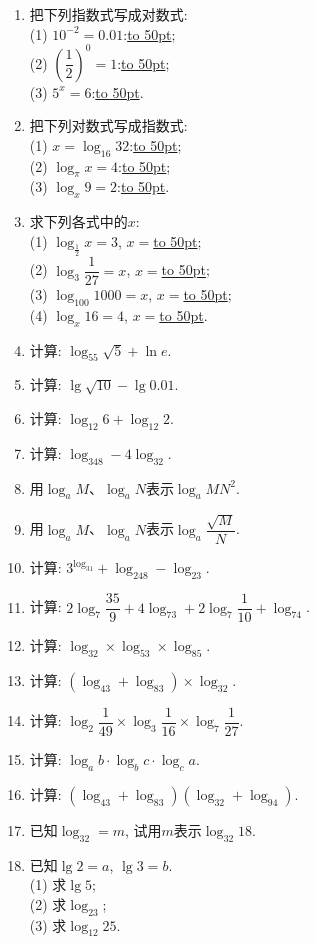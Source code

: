 \documentclass[10pt,a4paper]{article}
\newcommand{\blank}[1]{\underline{\hbox to #1pt{}}}
\begin{document}
\begin{enumerate}[1.]

\item 把下列指数式写成对数式:\\
(1) $10^{-2}=0.01$:\blank{50};\\
(2) $(\dfrac 12)^0=1$:\blank{50};\\
(3) $5^x=6$:\blank{50}.
\item 把下列对数式写成指数式:\\
(1) $x=\log _{16}32$:\blank{50};\\
(2) $\log _{\pi }x=4$:\blank{50};\\
(3) $\log _x9=2$:\blank{50}.
\item 求下列各式中的$x$:\\
(1) $\log _{\frac 12}x=3$, $x=$\blank{50};\\
(2) $\log _3\dfrac 1{27}=x$, $x=$\blank{50};\\
(3) $\log _{100}1000=x$, $x=$\blank{50};\\
(4) $\log _x16=4$, $x=$\blank{50}.
\item 计算: $\log _55\sqrt 5+\ln e$.
\item 计算: $\lg \sqrt {10}-\lg 0.01$.
\item 计算: $\log _{12}6+\log _{12}2$.
\item 计算: $\log _348-4\log _32$.
\item 用$\log _aM$、$\log _aN$表示$\log _aMN^2$.
\item 用$\log _aM$、$\log _aN$表示$\log _a\dfrac{\sqrt M}N$.
\item 计算: $3^{\log _31}+\log _248-\log _23$.
\item 计算: $2\log _7\dfrac{35}9+4\log _73+2\log _7\dfrac 1{10}+\log _74$.
\item 计算: $\log _32\times \log _53\times \log _85$.
\item 计算: $(\log _43+\log _83)\times \log _32$.
\item 计算: $\log _2\dfrac 1{49}\times \log _3\dfrac 1{16}\times \log _7\dfrac 1{27}$.
\item 计算: $\log _ab\cdot \log _bc\cdot \log _ca$.
\item 计算: $(\log _43+\log _83)(\log _32+\log _94)$.
\item 已知$\log _32=m$, 试用$m$表示$\log _{32}18$.
\item 已知$\lg 2=a$, $\lg 3=b$.\\
(1) 求$\lg 5$;\\
(2) 求$\log _23$;\\
(3) 求$\log _{12}25$.

\end{enumerate}
\end{document}
